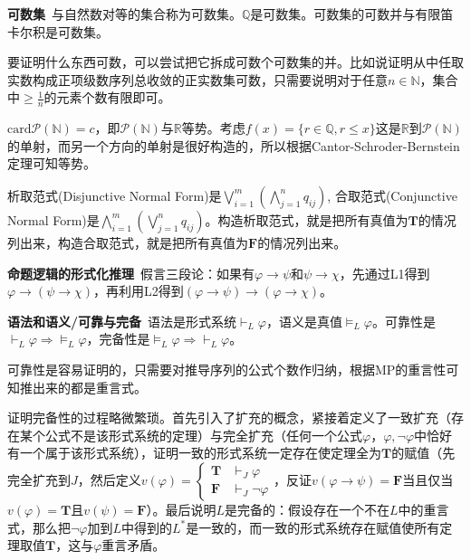 \documentclass[UTF-8]{ctexart}
\begin{document}
\textbf{可数集}\ 与自然数对等的集合称为可数集。$\mathbb Q$是可数集。可数集的可数并与有限笛卡尔积是可数集。

要证明什么东西可数，可以尝试把它拆成可数个可数集的并。比如说证明从中任取实数构成正项级数序列总收敛的正实数集可数，只需要说明对于任意$n \in \mathbb N$，集合中$\ge \frac{1}{n}$的元素个数有限即可。

$\text{card}\mathcal P(\mathbb N) = c$，即$\mathcal P(\mathbb N)$与$\mathbb R$等势。考虑$f(x) = \{r \in \mathbb Q, r \le x\}$这是$\mathbb R$到$\mathcal P(\mathbb N)$的单射，而另一个方向的单射是很好构造的，所以根据Cantor-Schroder-Bernstein定理可知等势。

析取范式(Disjunctive Normal Form)是$\bigvee_{i=1}^m(\bigwedge_{j=1}^{n}q_{ij})$, 合取范式(Conjunctive Normal Form)是$\bigwedge_{i=1}^m(\bigvee_{j=1}^{n}q_{ij})$。构造析取范式，就是把所有真值为$\mathbf T$的情况列出来，构造合取范式，就是把所有真值为$\mathbf F$的情况列出来。

\textbf{命题逻辑的形式化推理}\ 假言三段论：如果有$\varphi \to \psi$和$\psi \to \chi$，先通过L1得到$\varphi \to (\psi \to \chi)$，再利用L2得到$(\varphi \to \psi) \to (\varphi \to \chi)$。

\textbf{语法和语义/可靠与完备}\ 语法是形式系统$\vdash_L \varphi$，语义是真值$\vDash_L \varphi$。可靠性是$\vdash_L\varphi \Rightarrow \vDash_L\varphi$，完备性是$\vDash_L\varphi \Rightarrow \vdash_L\varphi$。

可靠性是容易证明的，只需要对推导序列的公式个数作归纳，根据MP的重言性可知推出来的都是重言式。

证明完备性的过程略微繁琐。首先引入了扩充的概念，紧接着定义了一致扩充（存在某个公式不是该形式系统的定理）与完全扩充（任何一个公式$\varphi$，$\varphi, \lnot\varphi$中恰好有一个属于该形式系统），证明一致的形式系统一定存在使定理全为$\mathbf T$的赋值（先完全扩充到$J$，然后定义$v(\varphi) = \begin{cases}
\mathbf T & \vdash_J\varphi\\
\mathbf F & \vdash_J\lnot\varphi
\end{cases}$，反证$v(\varphi \to \psi) = \mathbf F$当且仅当$v(\varphi) = \mathbf T$且$v(\psi) = \mathbf F$）。最后说明$L$是完备的：假设存在一个不在$L$中的重言式，那么把$\lnot\varphi$加到$L$中得到的$L^*$是一致的，而一致的形式系统存在赋值使所有定理取值$\mathbf T$，这与$\varphi$重言矛盾。
\end{document}
